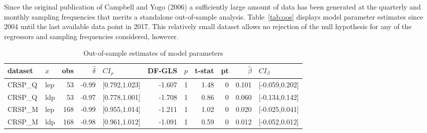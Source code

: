 \documentclass{article}
\begin{document}
Since the original publication of Campbell and Yogo (2006) a sufficiently large amount of data has been generated at the quarterly and monthly sampling frequencies that merits a standalone out-of-sample analysis. Table~\vref{tab:oos} displays model parameter estimates since 2004 until the last available data point in 2017. This relatively small dataset allows no rejection of the null hypothesis for any of the regressors and sampling frequencies considered, however. 
\begin{table}[ht]
\centering
\caption{Out-of-sample estimates of model parameters}
\label{tab:oos}
\begin{threeparttable}
\begin{tabular}{llrrlrrrrrl}
  \hline
dataset & $x$ & obs & $\hat{\delta}$ & $CI_{\rho}$ & DF-GLS & $p$ &t-stat & pt & $\hat{\beta}$ & $CI_{\beta}$ \\ 
  \hline
  CRSP\_Q  & lep & 53 & -0.99 & [0.792,1.023] & -1.607 & 1 & 1.48 & 0 & 0.101 & [-0.059,0.202] \\ 
  CRSP\_Q & ldp & 53 & -0.97 & [0.778,1.001] & -1.708 & 1 & 0.86 & 0 & 0.060 & [-0.134,0.142] \\ 
  CRSP\_M & lep & 168 & -0.99 & [0.955,1.014] & -1.211 & 1 & 1.02 & 0 & 0.020 & [-0.025,0.041] \\ 
  CRSP\_M & ldp & 168 & -0.98 & [0.961,1.012] & -1.091 & 1 & 0.59 & 0 & 0.012 & [-0.052,0.012] \\ 
\hline
\end{tabular}

\end{threeparttable}
\end{table}
\end{document}
